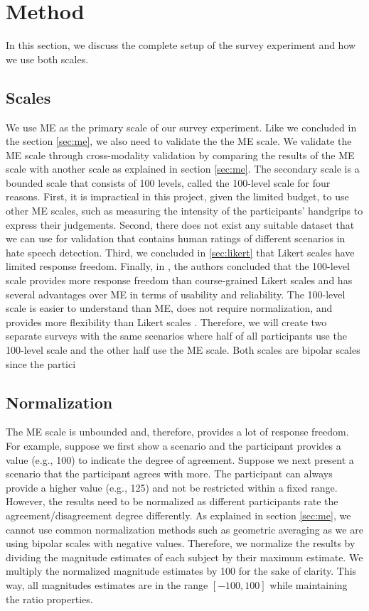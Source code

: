 \section{Method}
\label{sec:survey-method}
In this section, we discuss the complete setup of the survey experiment and how we use both scales.

\subsection{Scales}
We use ME as the primary scale of our survey experiment.
%
Like we concluded in the section \ref{sec:me}, we also need to validate the the ME scale.
%
We validate the ME scale through cross-modality validation by comparing the results of the ME scale with another scale as explained in section \ref{sec:me}.
%
The secondary scale is a bounded scale that consists of 100 levels, called the 100-level scale  for four reasons.
%
First, it is impractical in this project, given the limited budget, to use other ME scales, such as measuring the intensity of the participants' handgrips to express their judgements.
%
Second, there does not exist any suitable dataset that we can use for validation that contains human ratings of different scenarios in hate speech detection.
%
Third, we concluded in \ref{sec:likert} that Likert scales have limited response freedom.
%
Finally, in \cite{roitero2018fine}, the authors concluded that the 100-level scale provides more response freedom than course-grained Likert scales and has several advantages over ME in terms of usability and reliability.
%
The 100-level scale is easier to understand than ME, does not require normalization, and provides more flexibility than Likert scales \cite{roitero2018fine}.
%
Therefore, we will create two separate surveys with the same scenarios where half of all participants use the 100-level scale and the other half use the ME scale.
%
Both scales are bipolar scales since the partici

\subsection{Normalization}
The ME scale is unbounded and, therefore, provides a lot of response freedom.
%
For example, suppose we first show a scenario and the participant provides a value (e.g., 100) to indicate the degree of agreement.
%
Suppose we next present a scenario that the participant agrees with more.
%
The participant can always provide a higher value (e.g., 125) and not be restricted within a fixed range.
%
However, the results need to be normalized as different participants rate the agreement/disagreement degree differently.
%
As explained in section \ref{sec:me}, we cannot use common normalization methods such as geometric averaging as we are using bipolar scales with negative values.
%
Therefore, we normalize the results by dividing the magnitude estimates of each subject by their maximum estimate.
%
We multiply the normalized magnitude estimates by 100 for the sake of clarity.
%
This way, all magnitudes estimates are in the range $[-100, 100]$ while maintaining the ratio properties.

